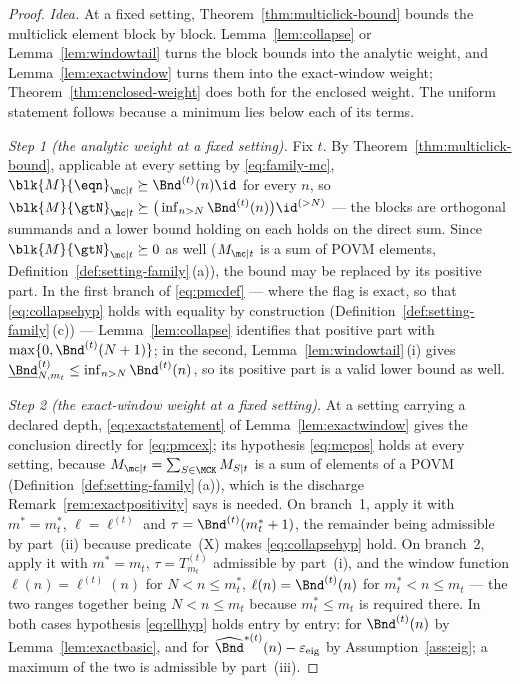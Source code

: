 \begin{proof}
\emph{Idea.} At a fixed setting, Theorem~\ref{thm:multiclick-bound} bounds the
multiclick element block by block. Lemma~\ref{lem:collapse} or
Lemma~\ref{lem:windowtail} turns the block bounds into the analytic weight,
and Lemma~\ref{lem:exactwindow} turns them into the exact-window weight;
Theorem~\ref{thm:enclosed-weight} does both for the enclosed weight. The
uniform statement follows because a minimum lies below each of its terms.

\emph{Step 1 (the analytic weight at a fixed setting).} Fix $t$. By
Theorem~\ref{thm:multiclick-bound}, applicable at every setting by
\eqref{eq:family-mc}, $\blk{M}{\eqn}_{\mc|t}\succeq\Bnd^{(t)}(n)\id$ for
every $n$, so
$\blk{M}{\gtN}_{\mc|t}\succeq\big(\inf_{n>N}\Bnd^{(t)}(n)\big)\id^{(>N)}$
--- the blocks are orthogonal summands and a lower bound holding on each
holds on the direct sum. Since $\blk{M}{\gtN}_{\mc|t}\succeq0$ as well
($M_{\mc|t}$ is a sum of POVM elements,
Definition~\ref{def:setting-family}\,(a)), the bound may be replaced by its
positive part. In the first branch of \eqref{eq:pmcdef} --- where the flag
is $\mathrm{exact}$, so that \eqref{eq:collapsehyp} holds with equality by
construction (Definition~\ref{def:setting-family}\,(c)) ---
Lemma~\ref{lem:collapse} identifies that positive part with
$\max\{0,\Bnd^{(t)}(N+1)\}$; in the second,
Lemma~\ref{lem:windowtail}\,(i) gives
$\underline{\Bnd}^{(t)}_{N,m_t}\le\inf_{n>N}\Bnd^{(t)}(n)$, so its positive
part is a valid lower bound as well.

\emph{Step 2 (the exact-window weight at a fixed setting).} At a setting
carrying a declared depth, \eqref{eq:exactstatement} of
Lemma~\ref{lem:exactwindow} gives the conclusion directly for
\eqref{eq:pmcex}; its hypothesis \eqref{eq:mcpos} holds at every setting,
because $M_{\mc|t}=\sum_{S\in\MCK}M_{S|t}$ is a sum of elements of a POVM
(Definition~\ref{def:setting-family}\,(a)), which is the discharge
Remark~\ref{rem:exactpositivity} says is needed. On branch~1, apply it with
$m^{\ast}=m^{\ast}_t$, $\ell=\ell^{(t)}$ and
$\tau=\Bnd^{(t)}(m^{\ast}_t+1)$, the remainder being admissible by
part~(ii) because predicate~(X) makes \eqref{eq:collapsehyp} hold. On
branch~2, apply it with $m^{\ast}=m_t$, $\tau=T^{(t)}_{m_t}$ admissible by
part~(i), and the window function $\ell(n)=\ell^{(t)}(n)$ for
$N<n\le m^{\ast}_t$, $\ell(n)=\Bnd^{(t)}(n)$ for $m^{\ast}_t<n\le m_t$ ---
the two ranges together being $N<n\le m_t$ because $m^{\ast}_t\le m_t$ is
required there. In both cases hypothesis \eqref{eq:ellhyp} holds entry by
entry: for $\Bnd^{(t)}(n)$ by Lemma~\ref{lem:exactbasic}, and for
$\widehat\Bnd^{\ast(t)}(n)-\varepsilon_{\mathrm{eig}}$ by
Assumption~\ref{ass:eig}; a maximum of the two is admissible by
part~(iii).


\end{proof}
